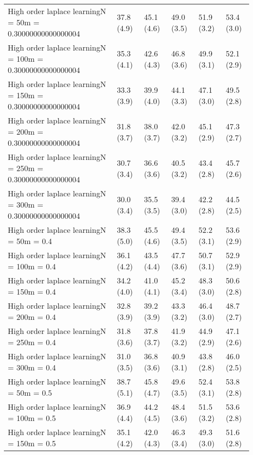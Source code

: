 \documentclass{article}
\begin{document}
\begin{table*}[t!]
\begin{center}
\begin{small}
\begin{sc}
\begin{tabular}{llllll}
High order laplace learningN = 50m = 0.30000000000000004&37.8 (4.9)      &45.1 (4.6)      &49.0 (3.5)      &51.9 (3.2)      &53.4 (3.0)      \\
High order laplace learningN = 100m = 0.30000000000000004&35.3 (4.1)      &42.6 (4.3)      &46.8 (3.6)      &49.9 (3.1)      &52.1 (2.9)      \\
High order laplace learningN = 150m = 0.30000000000000004&33.3 (3.9)      &39.9 (4.0)      &44.1 (3.3)      &47.1 (3.0)      &49.5 (2.8)      \\
High order laplace learningN = 200m = 0.30000000000000004&31.8 (3.7)      &38.0 (3.7)      &42.0 (3.2)      &45.1 (2.9)      &47.3 (2.7)      \\
High order laplace learningN = 250m = 0.30000000000000004&30.7 (3.4)      &36.6 (3.6)      &40.5 (3.2)      &43.4 (2.8)      &45.7 (2.6)      \\
High order laplace learningN = 300m = 0.30000000000000004&30.0 (3.4)      &35.5 (3.5)      &39.4 (3.0)      &42.2 (2.8)      &44.5 (2.5)      \\
High order laplace learningN = 50m = 0.4&38.3 (5.0)      &45.5 (4.6)      &49.4 (3.5)      &52.2 (3.1)      &53.6 (2.9)      \\
High order laplace learningN = 100m = 0.4&36.1 (4.2)      &43.5 (4.4)      &47.7 (3.6)      &50.7 (3.1)      &52.9 (2.9)      \\
High order laplace learningN = 150m = 0.4&34.2 (4.0)      &41.0 (4.1)      &45.2 (3.4)      &48.3 (3.0)      &50.6 (2.8)      \\
High order laplace learningN = 200m = 0.4&32.8 (3.9)      &39.2 (3.9)      &43.3 (3.2)      &46.4 (3.0)      &48.7 (2.7)      \\
High order laplace learningN = 250m = 0.4&31.8 (3.6)      &37.8 (3.7)      &41.9 (3.2)      &44.9 (2.9)      &47.1 (2.6)      \\
High order laplace learningN = 300m = 0.4&31.0 (3.5)      &36.8 (3.6)      &40.9 (3.1)      &43.8 (2.8)      &46.0 (2.5)      \\
High order laplace learningN = 50m = 0.5&38.7 (5.1)      &45.8 (4.7)      &49.6 (3.5)      &52.4 (3.1)      &53.8 (2.8)      \\
High order laplace learningN = 100m = 0.5&36.9 (4.4)      &44.2 (4.5)      &48.4 (3.6)      &51.5 (3.2)      &53.6 (2.8)      \\
High order laplace learningN = 150m = 0.5&35.1 (4.2)      &42.0 (4.3)      &46.3 (3.4)      &49.3 (3.0)      &51.6 (2.8)      \\

\end{tabular}
\end{sc}
\end{small}
\end{center}
\end{table*}
\end{document}

